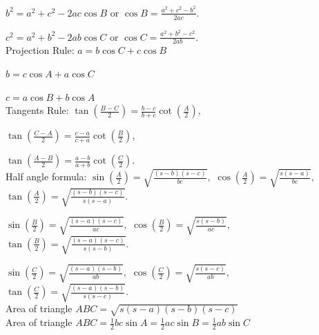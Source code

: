 \documentclass{article}
\begin{document}
$b^{2}=a^{2}+c^{2}-2ac \cos B$ or $\cos B=\frac{a^{2}+c^{2}-b^{2}}{2ac}.$

$c^{2}=a^{2}+b^{2}-2ab \cos C$ or $\cos C=\frac{a^{2}+b^{2}-c^{2}}{2ab}.$
\\Projection Rule:
$a=b\cos C+c\cos B$

$b=c\cos A+a\cos C$

$c=a\cos B+b\cos A$
\\Tangents Rule:
$\tan(\frac{B-C}{2})=\frac{b-c}{b+c}\cot(\frac{A}{2}),$

$\tan(\frac{C-A}{2})=\frac{c-a}{c+a}\cot(\frac{B}{2}),$

$\tan(\frac{A-B}{2})=\frac{a-b}{a+b}\cot(\frac{C}{2}).$
\\Half angle formula:
$\sin(\frac{A}{2})=\sqrt{\frac{(s-b)(s-c)}{bc}},$ $\cos(\frac{A}{2})=\sqrt{\frac{s(s-a)}{bc}},$ $\tan(\frac{A}{2})=\sqrt{\frac{(s-b)(s-c)}{s(s-a)}}.$

$\sin(\frac{B}{2})=\sqrt{\frac{(s-a)(s-c)}{ac}},$ $\cos(\frac{B}{2})=\sqrt{\frac{s(s-b)}{ac}},$ $\tan(\frac{B}{2})=\sqrt{\frac{(s-a)(s-c)}{s(s-b)}}.$

$\sin(\frac{C}{2})=\sqrt{\frac{(s-a)(s-b)}{ab}},$ $\cos(\frac{C}{2})=\sqrt{\frac{s(s-c)}{ab}},$ $\tan(\frac{C}{2})=\sqrt{\frac{(s-a)(s-b)}{s(s-c)}}.$
\\Area of triangle $ABC=\sqrt{s(s-a)(s-b)(s-c)}$
\\Area of triangle $ABC=\frac{1}{2}bc\sin A=\frac{1}{2}ac\sin B=\frac{1}{2}ab\sin C$
\end{document}
